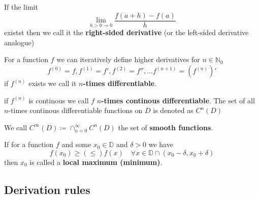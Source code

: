 \begin{definition}
    If the limit 
    $$\lim_{h>0 \to 0}\frac{f(a+h)-f(a)}{h}$$
    existst then we call it the \textbf{right-sided derivative} (or the left-sided derivative analogue)
\end{definition}

\begin{definition}
    For a function $f$ we can iteratively define higher derivatives for $n \in \mathbb{N}_0$
    $$ f^(0) = f, f^(1) = f', f^(2) = f'', \dots f^(n+1) = (f^(n))'$$
    if $f^(n)$ exists we call it $n$\textbf{-times differentiable}.
\end{definition}

\begin{definition}
    if $f^(n)$ is continous we call $f$ $n$\textbf{-times continous differentiable}. The set of all $n$-times continous differentiable functions on $D$ is denoted as $C^n(D)$
\end{definition}

\begin{definition}
    We call $C^{\infty}(D) \coloneqq \cap_{n=0}^{\infty} C^n(D)$ the set of \textbf{smooth functions}.
\end{definition}

\begin{definition}
    If for a function $f$ and some $x_0 \in \mathbb{D}$ and $\delta \gt 0$ we have
    $$f(x_0) \geq (\leq) f(x) \quad \forall x \in \mathbb{D} \cap (x_0 - \delta, x_0 + \delta)$$
    then $x_0$ is called a \textbf{local maximum (minimum)}.
\end{definition}

\subsection{Derivation rules}

